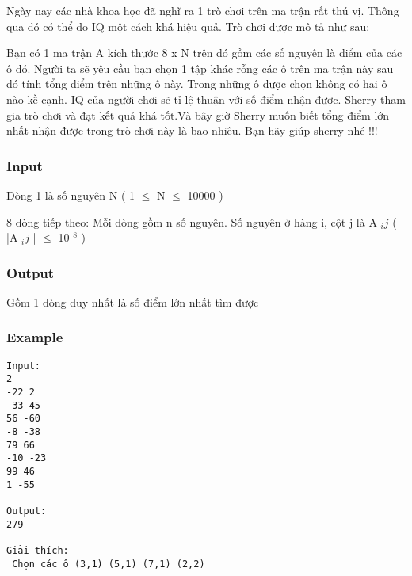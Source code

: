 



   Ngày nay các nhà khoa học đã nghĩ ra 1 trò chơi trên ma trận rất thú vị. Thông qua đó có thể đo IQ một cách khá hiệu quả. Trò chơi được mô tả như sau:  

   Bạn có 1 ma trận A kích thước 8 x N trên đó gồm các số nguyên là điểm của các ô đó. Người ta sẽ yêu cầu bạn chọn 1 tập khác rỗng các ô trên ma trận này sau đó tính tổng điểm trên những ô này. Trong những ô được chọn không có hai ô nào kề cạnh. IQ của người chơi sẽ tỉ lệ thuận với số điểm nhận được. Sherry tham gia trò chơi và đạt kết quả khá tốt.Và bây giờ Sherry muốn biết tổng điểm lớn nhất nhận được trong trò chơi này là bao nhiêu. Bạn hãy giúp sherry nhé !!!  

\subsubsection{   Input  }

   Dòng 1 là số nguyên N ( 1  $\le$  N  $\le$  10000 )  

   8 dòng tiếp theo: Mỗi dòng gồm n số nguyên. Số nguyên ở hàng i, cột j là A   $_    ij   $   ( |A   $_    ij   $   |  $\le$  10   $^    8   $   )  

\subsubsection{   Output  }

   Gồm 1 dòng duy nhất là số điểm lớn nhất tìm được  

\subsubsection{   Example  }
\begin{verbatim}
Input:
2
-22 2
-33 45
56 -60
-8 -38
79 66
-10 -23
99 46
1 -55

Output:
279

Giải thích:
 Chọn các ô (3,1) (5,1) (7,1) (2,2)

\end{verbatim}
